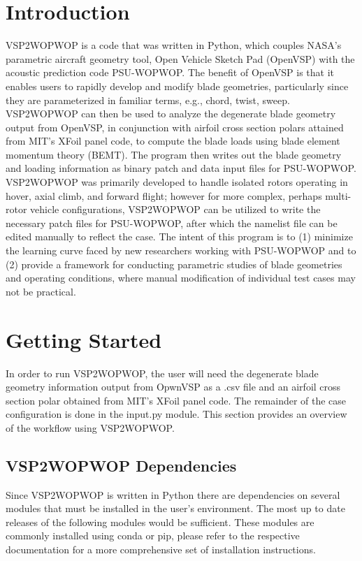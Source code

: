 \documentclass[journal ]{new-aiaa}
\begin{document}
\section{Introduction}

VSP2WOPWOP is a code that was written in Python, which couples NASA's parametric aircraft geometry tool, Open Vehicle Sketch Pad (OpenVSP) with the acoustic prediction code PSU-WOPWOP. The benefit of OpenVSP is that it enables users to rapidly develop and modify blade geometries, particularly since they are parameterized in familiar terms, e.g., chord, twist, sweep. VSP2WOPWOP can then be used to analyze the degenerate blade geometry output from OpenVSP, in conjunction with airfoil cross section polars attained from MIT's XFoil panel code, to compute the blade loads using blade element momentum theory (BEMT). The program then writes out the blade geometry and loading information as binary patch and data input files for PSU-WOPWOP. VSP2WOPWOP was primarily developed to handle isolated rotors operating in hover, axial climb, and forward flight; however for more complex, perhaps multi-rotor vehicle configurations, VSP2WOPWOP can be utilized to write the necessary patch files for PSU-WOPWOP, after which the namelist file can be edited manually to reflect the case. The intent of this program is to (1) minimize the learning curve faced by new researchers working with PSU-WOPWOP and to (2) provide a framework for conducting parametric studies of blade geometries and operating conditions, where manual modification of individual test cases may not be practical.  

\section{Getting Started} 

In order to run VSP2WOPWOP, the user will need the degenerate blade geometry information output from OpwnVSP as a .csv file and an airfoil cross section polar obtained from MIT's XFoil panel code. The remainder of the case configuration is done in the input.py module. This section provides an overview of the workflow using VSP2WOPWOP.  

\subsection{VSP2WOPWOP Dependencies}
Since VSP2WOPWOP is written in Python there are dependencies on several modules that must be installed in the user's environment. The most up to date releases of the following modules would be sufficient. These modules are commonly installed using conda or pip, please refer to the respective documentation for a more comprehensive set of installation instructions.  
\end{document}
